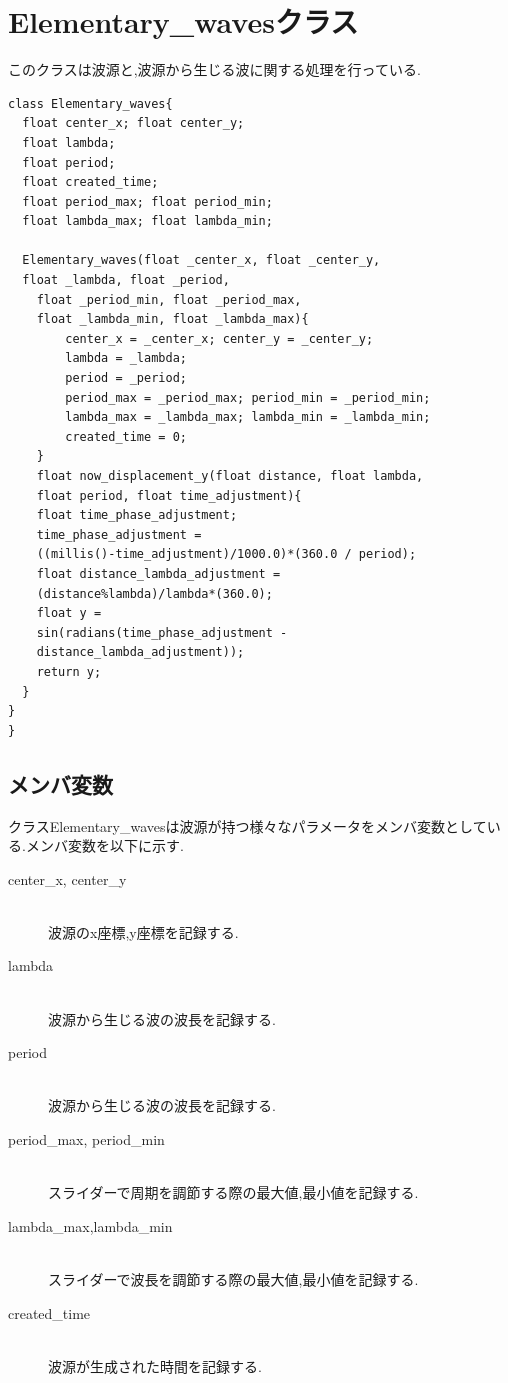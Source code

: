 \section{Elementary\_wavesクラス} 
このクラスは波源と,波源から生じる波に関する処理を行っている.
 \begin{framed}
{\small
\begin{verbatim}
class Elementary_waves{
  float center_x; float center_y;
  float lambda;
  float period;
  float created_time;
  float period_max; float period_min;
  float lambda_max; float lambda_min;

  Elementary_waves(float _center_x, float _center_y, 
  float _lambda, float _period, 
    float _period_min, float _period_max, 
    float _lambda_min, float _lambda_max){
    	center_x = _center_x; center_y = _center_y;
    	lambda = _lambda;
    	period = _period;
    	period_max = _period_max; period_min = _period_min;
    	lambda_max = _lambda_max; lambda_min = _lambda_min;
    	created_time = 0; 
    }
    float now_displacement_y(float distance, float lambda, 
    float period, float time_adjustment){
    float time_phase_adjustment;
    time_phase_adjustment = 
    ((millis()-time_adjustment)/1000.0)*(360.0 / period); 
    float distance_lambda_adjustment = 
    (distance%lambda)/lambda*(360.0);
    float y = 
    sin(radians(time_phase_adjustment - 
    distance_lambda_adjustment));
    return y;
  }
}
}
\end{verbatim}}
\end{framed}
 
 
 \subsection{メンバ変数}
 クラスElementary\_wavesは波源が持つ様々なパラメータをメンバ変数としている.メンバ変数を以下に示す.
 \begin{description}
 \item[center\_x, center\_y]\mbox{}\\
 波源のx座標,y座標を記録する.
 \item[lambda]\mbox{}\\
 波源から生じる波の波長を記録する.
  \item[period]\mbox{}\\
  波源から生じる波の波長を記録する.
   \item[period\_max, period\_min]\mbox{}\\
   スライダーで周期を調節する際の最大値,最小値を記録する.
    \item[lambda\_max,lambda\_min]\mbox{}\\
    スライダーで波長を調節する際の最大値,最小値を記録する.
     \item[created\_time]\mbox{}\\
     波源が生成された時間を記録する.
 \end{description}

